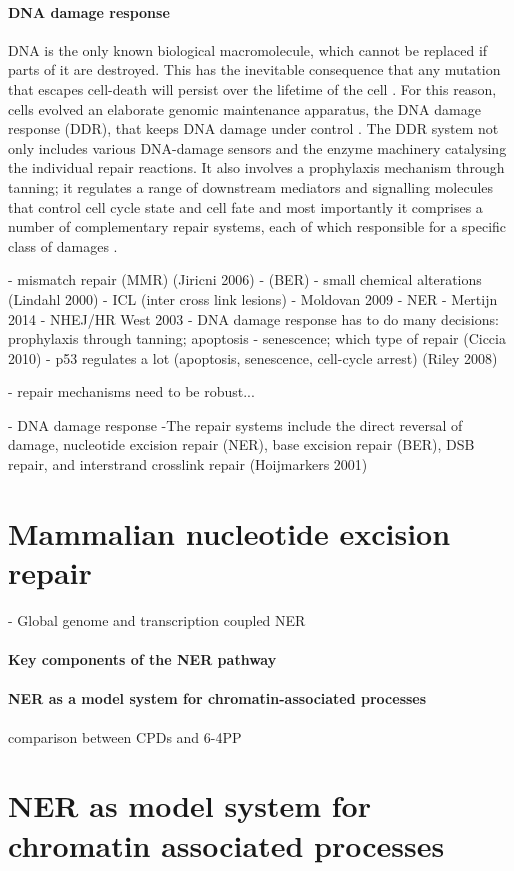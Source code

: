 \paragraph{DNA damage response}    
DNA is the only known biological macromolecule, which cannot be replaced if parts of it are destroyed. This has the inevitable consequence that any mutation that escapes cell-death will persist over the lifetime of the cell \cite{Hoeijmakers2009,Marteijn2014}. For this reason, cells evolved an elaborate genomic maintenance apparatus, the DNA damage response (DDR), that keeps DNA damage under control \cite{Ciccia2010}. The DDR system not only includes various DNA-damage sensors and the enzyme machinery catalysing the individual repair reactions. It also  involves a prophylaxis mechanism through tanning; it regulates a range of downstream mediators and signalling molecules that control cell cycle state and cell fate and most importantly it comprises a number of complementary repair systems, each of which responsible for a specific class of damages \cite{Ciccia2010,Marteijn2014}.     




- mismatch repair (MMR) (Jiricni 2006)
- (BER) - small chemical alterations (Lindahl 2000)
- ICL (inter cross link lesions) - Moldovan 2009
- NER - Mertijn 2014
- NHEJ/HR  West 2003
- DNA damage response has to do many decisions: prophylaxis through tanning; apoptosis - senescence; which type of repair (Ciccia 2010)
- p53 regulates a lot (apoptosis, senescence, cell-cycle arrest) (Riley 2008)

- repair mechanisms need to be robust...

 
- DNA damage response
-The repair systems include the direct reversal of
damage, nucleotide excision repair (NER), base excision repair (BER), DSB repair, and interstrand crosslink repair (Hoijmarkers 2001)

\section{Mammalian nucleotide excision repair}
\label{sec:NERexperiments}
- Global genome and transcription coupled NER

\paragraph{Key components of the NER pathway}
\paragraph{NER as a model system for chromatin-associated processes}
comparison between CPDs and 6-4PP

\section{NER as model system for chromatin associated processes}

